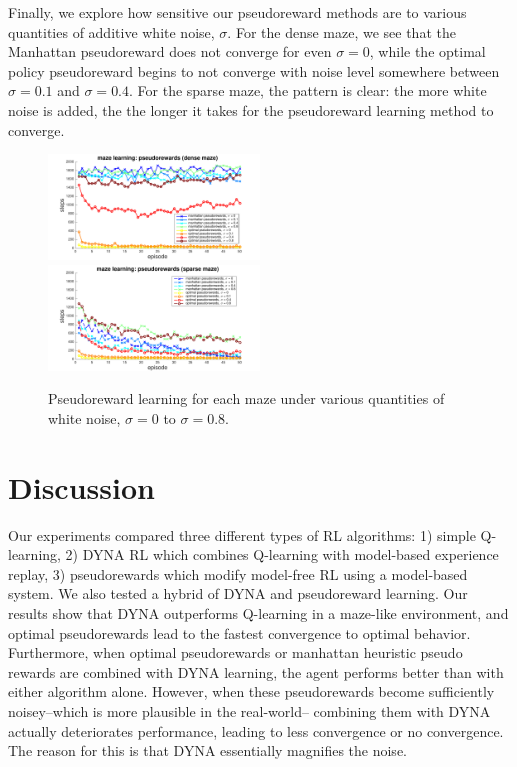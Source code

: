 \documentclass[notitlepage]{article}
\begin{document}
Finally, we explore how sensitive our pseudoreward methods are to various quantities of additive white noise, $\sigma$. For the dense maze, we see that the Manhattan pseudoreward does not converge for even $\sigma = 0$, while the optimal policy pseudoreward begins to not converge with noise level somewhere between $\sigma = 0.1$ and $\sigma = 0.4$. For the sparse maze, the pattern is clear: the more white noise is added, the the longer it takes for the pseudoreward learning method to converge.

\begin{figure}[ht]
\centering
\includegraphics[width=0.5\textwidth]{PRdenseCompare}
\includegraphics[width=0.5\textwidth]{PRsparseCompare}
\caption{Pseudoreward learning for each maze under various quantities of white noise, $\sigma = 0$ to $\sigma = 0.8$.}
\label{fig:sigma-compare}
\end{figure}

\section*{Discussion}

Our experiments compared three different types of RL algorithms: 1) simple Q-learning, 2) DYNA RL which combines Q-learning with model-based experience replay, 3) pseudorewards which modify model-free RL using a model-based system. We also tested a hybrid of DYNA and pseudoreward learning. Our results show that DYNA outperforms Q-learning in a maze-like environment, and optimal pseudorewards lead to the fastest convergence to optimal behavior. Furthermore, when optimal pseudorewards or manhattan heuristic pseudo rewards are combined with DYNA learning, the agent performs better than with either algorithm alone. However, when these pseudorewards become sufficiently noisey--which is more plausible in the real-world-- combining them with DYNA actually deteriorates performance, leading to less convergence or no convergence. The reason for this is that DYNA essentially magnifies the noise.
\end{document}
